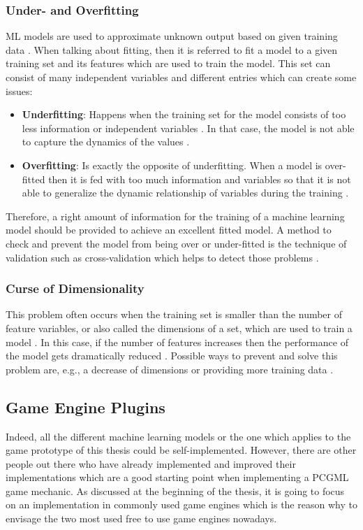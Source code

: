 \documentclass[MGS,Master,english]{twbook}%
\begin{document}
\subsubsection{Under- and Overfitting}
ML models are used to approximate unknown output based on given training data \cite{ml::book::algorithms}. When talking about fitting, then it is referred to fit a model to a given training set and its features which are used to train the model. This set can consist of many independent variables and different entries which can create some issues:
\begin{itemize}
	\item \textbf{Underfitting}: Happens when the training set for the model consists of too less information or independent variables \cite{ml::book::algorithms}. In that case, the model is not able to capture the dynamics of the values \cite{ml::book::algorithms}.
	\item \textbf{Overfitting}: Is exactly the opposite of underfitting. When a model is over-fitted then it is fed with too much information and variables so that it is not able to generalize the dynamic relationship of variables during the training \cite{ml::book::algorithms}.
\end{itemize}
Therefore, a right amount of information for the training of a machine learning model should be provided to achieve an excellent fitted model. A method to check and prevent the model from being over or under-fitted is the technique of validation such as cross-validation which helps to detect those problems \cite{ml::book::algorithms}.

\subsubsection{Curse of Dimensionality}
This problem often occurs when the training set is smaller than the number of feature variables, or also called the dimensions of a set, which are used to train a model \cite{ml::book::algorithms}. In this case, if the number of features increases then the performance of the model gets dramatically reduced \cite{ml::book::algorithms}. Possible ways to prevent and solve this problem are, e.g., a decrease of dimensions or providing more training data \cite{ml::book::algorithms}.

\subsection{Game Engine Plugins}
Indeed, all the different machine learning models or the one which applies to the game prototype of this thesis could be self-implemented. However, there are other people out there who have already implemented and improved their implementations which are a good starting point when implementing a PCGML game mechanic. As discussed at the beginning of the thesis, it is going to focus on an implementation in commonly used game engines which is the reason why to envisage the two most used free to use game engines nowadays.
\end{document}
